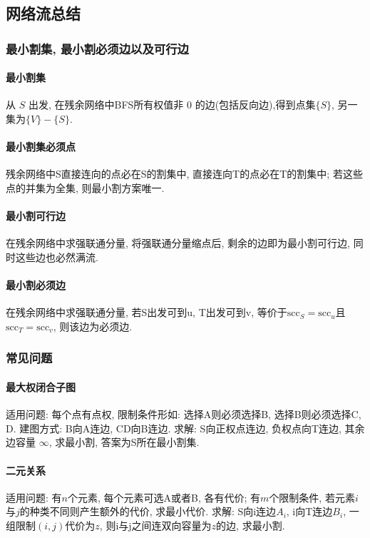\subsection{网络流总结}

\subsubsection{最小割集, 最小割必须边以及可行边}

\paragraph{最小割集} 从 $S$ 出发, 在残余网络中BFS所有权值非 $0$ 的边(包括反向边),得到点集$\{S\}$, 另一集为$\{V\} - \{S\}$. 
\paragraph{最小割集必须点} 残余网络中S直接连向的点必在S的割集中, 直接连向T的点必在T的割集中; 若这些点的并集为全集, 则最小割方案唯一.
\paragraph{最小割可行边} 在残余网络中求强联通分量, 将强联通分量缩点后, 剩余的边即为最小割可行边, 同时这些边也必然满流.
\paragraph{最小割必须边} 在残余网络中求强联通分量, 若S出发可到u, T出发可到v, 等价于$\mathrm{scc}_S=\mathrm{scc}_u$且$\mathrm{scc}_T = \mathrm{scc}_v$, 则该边为必须边.

\subsubsection{常见问题}

\paragraph{最大权闭合子图}
适用问题: 每个点有点权, 限制条件形如: 选择A则必须选择B, 选择B则必须选择C, D. 建图方式: B向A连边, CD向B连边.
求解: S向正权点连边, 负权点向T连边, 其余边容量 $\infty$, 求最小割, 答案为S所在最小割集.
\paragraph{二元关系}
适用问题: 有$n$个元素, 每个元素可选A或者B, 各有代价; 有$m$个限制条件, 若元素$i$与$j$的种类不同则产生额外的代价, 求最小代价.
求解: S向i连边$A_i$, i向T连边$B_i$, 一组限制$(i,j)$代价为$z$, 则i与j之间连双向容量为$z$的边, 求最小割.
